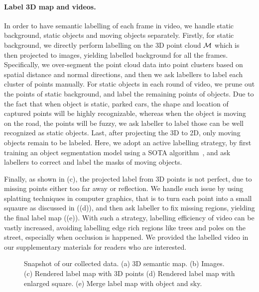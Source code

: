 \paragraph{Label 3D map and videos.}
In order to have semantic labelling of each frame in video, we handle static background, static objects and moving objects separately.
Firstly, for static background, we directly perform labelling on the 3D point cloud ${\mathcal M}$ which is then projected to images, yielding labelled background for all the frames.
Specifically, we over-segment the point cloud data into point clusters based on spatial distance and normal directions, and then we ask labellers to label each cluster of points manually.
For static objects in each round of video, we prune out the points of static background, and label the remaining points of objects. Due to the fact that when object is static, \eg parked cars, the shape and location of captured points will be highly recognizable, whereas when the object is moving on the road, the points will be fuzzy, we ask labeller to label those can be well recognized as static objects. Last, after projecting the 3D to 2D, only moving objects remain to be labeled. Here, we adopt an active labelling strategy, by first training an object segmentation model using a SOTA algorithm~\cite{WuSH16e}, and ask labellers to correct and label the masks of moving objects.

Finally, as shown in (c), the projected label from 3D points is not perfect, due to missing points either too far away or reflection. We handle such issue by using splatting techniques in computer graphics, that is to turn each point into a small squaure as discussed in  ((d)), and then ask labeller to fix missing regions, yielding the final label map ((e)).
With such a strategy, labelling efficiency of video can be vastly increased, avoiding labelling edge rich regions like trees and poles on the street, especially when occlusion is happened.
We provided the labelled video in our supplementary materials for readers who are interested.

\begin{figure}[t]
\begin{center}
\fbox{\rule{0pt}{2in} \rule{0.9\linewidth}{0pt}}
\end{center}
   \caption{Snapshot of our collected data. (a) 3D semantic map. (b) Images. (c) Rendered label map with 3D points (d) Rendered label map with enlarged square. (e) Merge label map with object and sky.}
\label{fig:data}
\end{figure}

